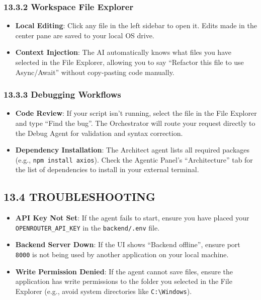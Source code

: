 \documentclass[
  12pt,
]{article}
\providecommand{\tightlist}{%
  \setlength{\itemsep}{0pt}\setlength{\parskip}{0pt}}
\begin{document}
\subsubsection{13.3.2 Workspace File
Explorer}\label{workspace-file-explorer}

\begin{itemize}
\tightlist
\item
  \textbf{Local Editing}: Click any file in the left sidebar to open it.
  Edits made in the center pane are saved to your local OS drive.
\item
  \textbf{Context Injection}: The AI automatically knows what files you
  have selected in the File Explorer, allowing you to say ``Refactor
  this file to use Async/Await'' without copy-pasting code manually.
\end{itemize}

\subsubsection{13.3.3 Debugging Workflows}\label{debugging-workflows}

\begin{itemize}
\tightlist
\item
  \textbf{Code Review}: If your script isn't running, select the file in
  the File Explorer and type ``Find the bug''. The Orchestrator will
  route your request directly to the Debug Agent for validation and
  syntax correction.
\item
  \textbf{Dependency Installation}: The Architect agent lists all
  required packages (e.g., \texttt{npm\ install\ axios}). Check the
  Agentic Panel's ``Architecture'' tab for the list of dependencies to
  install in your external terminal.
\end{itemize}

\subsection{13.4 TROUBLESHOOTING}\label{troubleshooting}

\begin{itemize}
\tightlist
\item
  \textbf{API Key Not Set}: If the agent fails to start, ensure you have
  placed your \texttt{OPENROUTER\_API\_KEY} in the \texttt{backend/.env}
  file.
\item
  \textbf{Backend Server Down}: If the UI shows ``Backend offline'',
  ensure port \texttt{8000} is not being used by another application on
  your local machine.
\item
  \textbf{Write Permission Denied}: If the agent cannot save files,
  ensure the application has write permissions to the folder you
  selected in the File Explorer (e.g., avoid system directories like
  \texttt{C:\textbackslash{}Windows}).
\end{itemize}
\end{document}
